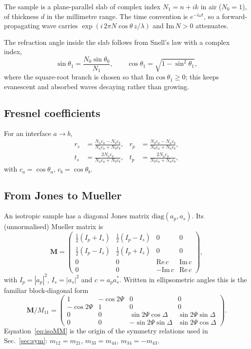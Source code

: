 \documentclass[11pt,a4paper]{article}
\newcommand{\lam}{\lambda}
\begin{document}
The sample is a plane-parallel slab of complex index $N_1=n+ik$ in air
($N_0=1$), of thickness $d$ in the millimetre range. The time convention is
$e^{-i\omega t}$, so a forward-propagating wave carries
$\exp\!\left(i\,2\pi N\cos\theta\, z/\lam\right)$ and $\mathrm{Im}\,N>0$
attenuates.

The refraction angle inside the slab follows from Snell's law with a complex
index,
\begin{equation}
\sin\theta_1=\frac{N_0\sin\theta_0}{N_1},\qquad
\cos\theta_1=\sqrt{1-\sin^2\theta_1},
\end{equation}
where the square-root branch is chosen so that $\mathrm{Im}\cos\theta_1\ge0$;
this keeps evanescent and absorbed waves decaying rather than growing.

\subsection{Fresnel coefficients}

For an interface $a\to b$,
\begin{align}
r_s&=\frac{N_a c_a-N_b c_b}{N_a c_a+N_b c_b}, &
r_p&=\frac{N_b c_a-N_a c_b}{N_b c_a+N_a c_b},\\
t_s&=\frac{2N_a c_a}{N_a c_a+N_b c_b}, &
t_p&=\frac{2N_a c_a}{N_b c_a+N_a c_b},
\end{align}
with $c_a=\cos\theta_a$, $c_b=\cos\theta_b$.

\subsection{From Jones to Mueller}

An isotropic sample has a diagonal Jones matrix $\mathrm{diag}(a_p,a_s)$. Its
(unnormalised) Mueller matrix is
\begin{equation}
\mathbf{M}=
\begin{pmatrix}
\tfrac12(I_p+I_s) & \tfrac12(I_p-I_s) & 0 & 0\\
\tfrac12(I_p-I_s) & \tfrac12(I_p+I_s) & 0 & 0\\
0 & 0 & \mathrm{Re}\,c & \mathrm{Im}\,c\\
0 & 0 & -\mathrm{Im}\,c & \mathrm{Re}\,c
\end{pmatrix},
\label{eq:mueller}
\end{equation}
with $I_p=|a_p|^2$, $I_s=|a_s|^2$ and $c=a_p a_s^{*}$. Written in ellipsometric
angles this is the familiar block-diagonal form
\begin{equation}
\mathbf{M}/M_{11}=
\begin{pmatrix}
1 & -\cos2\Psi & 0 & 0\\
-\cos2\Psi & 1 & 0 & 0\\
0&0& \sin2\Psi\cos\Delta & \sin2\Psi\sin\Delta\\
0&0& -\sin2\Psi\sin\Delta & \sin2\Psi\cos\Delta
\end{pmatrix}.
\label{eq:isoMM}
\end{equation}
Equation~\eqref{eq:isoMM} is the origin of the symmetry relations used in
Sec.~\ref{sec:sym}: $m_{12}=m_{21}$, $m_{33}=m_{44}$, $m_{34}=-m_{43}$.
\end{document}
